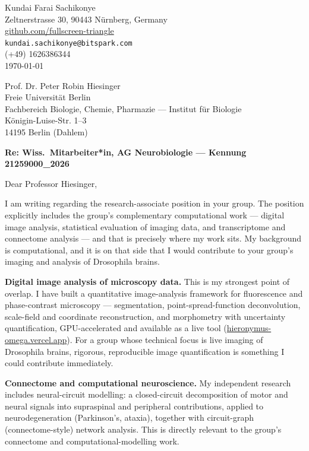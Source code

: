 \documentclass[12pt,a4paper]{article}
\begin{document}
\begin{flushright}
Kundai Farai Sachikonye \\
Zeltnerstrasse 30, 90443 Nürnberg, Germany \\
\href{https://github.com/fullscreen-triangle}{github.com/fullscreen-triangle} \\
\texttt{kundai.sachikonye@bitspark.com} \\
(+49) 1626386344 \\[6pt]
\today
\end{flushright}

\vspace{1em}

Prof. Dr. Peter Robin Hiesinger \\
Freie Universität Berlin \\
Fachbereich Biologie, Chemie, Pharmazie --- Institut für Biologie \\
Königin-Luise-Str. 1--3 \\
14195 Berlin (Dahlem)

\vspace{1.5em}

\textbf{Re: Wiss.\ Mitarbeiter*in, AG Neurobiologie --- Kennung 21259000\_2026}

\vspace{1em}

Dear Professor Hiesinger,

I am writing regarding the research-associate position in your group. The
position explicitly includes the group's complementary computational work ---
digital image analysis, statistical evaluation of imaging data, and transcriptome
and connectome analysis --- and that is precisely where my work sits. My
background is computational, and it is on that side that I would contribute to
your group's imaging and analysis of Drosophila brains.

\textbf{Digital image analysis of microscopy data.}
This is my strongest point of overlap. I have built a quantitative
image-analysis framework for fluorescence and phase-contrast microscopy ---
segmentation, point-spread-function deconvolution, scale-field and coordinate
reconstruction, and morphometry with uncertainty quantification, GPU-accelerated
and available as a live tool
(\href{https://hieronymus-omega.vercel.app/}{hieronymus-omega.vercel.app}). For a
group whose technical focus is live imaging of Drosophila brains, rigorous,
reproducible image quantification is something I could contribute immediately.

\textbf{Connectome and computational neuroscience.}
My independent research includes neural-circuit modelling: a closed-circuit
decomposition of motor and neural signals into supraspinal and peripheral
contributions, applied to neurodegeneration (Parkinson's, ataxia), together with
circuit-graph (connectome-style) network analysis. This is directly relevant to
the group's connectome and computational-modelling work.
\end{document}

